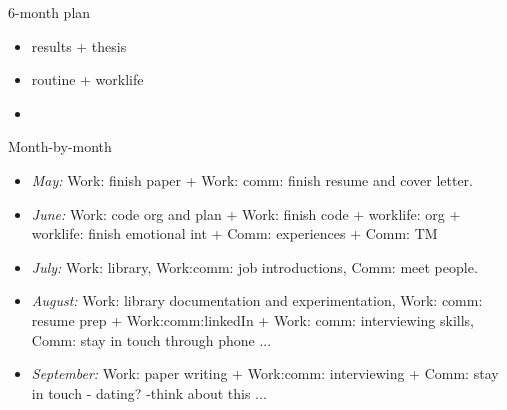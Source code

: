 \documentclass[serif, mathserif, final]{beamer}
\begin{document}
\begin{frame}{}
\begin{columns}
\begin{column}{0.5\linewidth}
    \begin{block}{6-month plan}
      \begin{itemize}
        \small \item \small results + thesis
      \item \small routine + worklife
      \item \small 
      \end{itemize}
    \end{block} 
    
    \begin{block}{Month-by-month}
      \begin{itemize}

      \item \small \textit{May:} Work: finish paper  + Work: comm:
        finish resume and cover letter. 

      \item \small \textit{June:} Work: code org and plan + Work:
        finish code + worklife: org + worklife: finish emotional int +
        Comm: experiences + Comm: TM 

      \item \small \textit{July:} Work: library, Work:comm: job
        introductions, Comm: meet people. 
      
      \item \small \textit{August:} Work: library documentation and
        experimentation, Work: comm: resume prep + Work:comm:linkedIn
        + Work: comm: interviewing skills, Comm: stay in touch
        through phone ... 
      \item \small \textit{September:} Work: paper writing + Work:comm: interviewing + Comm: stay in touch - dating? -think
        about this ...
      \end{itemize}
    \end{block}


\end{column}
\end{columns}
\end{frame}
\end{document}
